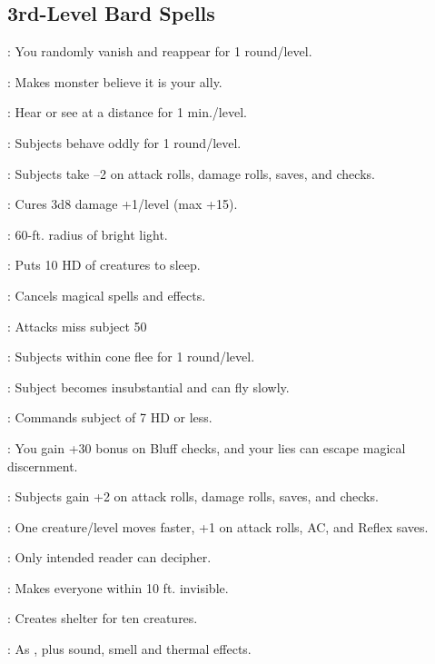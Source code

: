 \begin{multicols}{2}
\subsection{3rd-Level Bard Spells}
\begin{description*}
\item[\linkspell{Blink}:] You randomly vanish and reappear for 1 round/level.
\item[\linkspell{Charm Monster}:] Makes monster believe it is your ally.
\item[\linkspell{Clairaudience/Clairvoyance}:] Hear or see at a distance for 1 min./level.
\item[\linkspell{Confusion}:] Subjects behave oddly for 1 round/level.
\item[\linkspell{Crushing Despair}:] Subjects take –2 on attack rolls, damage rolls, saves, and checks.
\item[\linkspell{Cure Serious Wounds}:] Cures 3d8 damage +1/level (max +15).
\item[\linkspell{Daylight}:] 60-ft. radius of bright light.
\item[\linkspell{Deep Slumber}:] Puts 10 HD of creatures to sleep.
\item[\linkspell{Dispel Magic}:] Cancels magical spells and effects.
\item[\linkspell{Displacement}:] Attacks miss subject 50%
\item[\linkspell{Fear}:] Subjects within cone flee for 1 round/level.
\item[\linkspell{Gaseous Form}:] Subject becomes insubstantial and can fly slowly.
\item[\linkspell{Geas, Lesser}:] Commands subject of 7 HD or less.
\item[\linkspell{Glibness}:] You gain +30 bonus on Bluff checks, and your lies can escape magical discernment.
\item[\linkspell{Good Hope}:] Subjects gain +2 on attack rolls, damage rolls, saves, and checks.
\item[\linkspell{Haste}:] One creature/level moves faster, +1 on attack rolls, AC, and Reflex saves.
\item[\linkspell{Illusory Script}:] Only intended reader can decipher.
\item[\linkspell{Invisibility Sphere}:] Makes everyone within 10 ft. invisible.
\item[\linkspell{Leomund’s Tiny Hut}:] Creates shelter for ten creatures.
\item[\linkspell{Major Image}:] As , plus sound, smell and thermal effects.

\end{description*}
\end{multicols}
